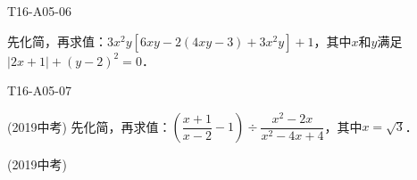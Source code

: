 \begin{defproblem}{T16-A05-06}%
\begin{onlyproblem}%
先化简，再求值：$3x^{2}y[6xy-2(4xy-3)+3x^{2}y]+1$，其中$x$和$y$满足$\vert2x+1\vert+(y-2)^{2}=0$．
\end{onlyproblem}%
\begin{onlysolution}%

\end{onlysolution}%
\end{defproblem}

\begin{defproblem}{T16-A05-07}%
\begin{onlyproblem}%
(2019中考) 
先化简，再求值：$\left( {\dfrac{x+1}{x-2}-1} \right)\div \dfrac{x^2-2x}{x^2-4x+4}$，其中$x=\sqrt 3 $．
\end{onlyproblem}%
\begin{onlysolution}%
(2019中考)
\end{onlysolution}%
\end{defproblem}

